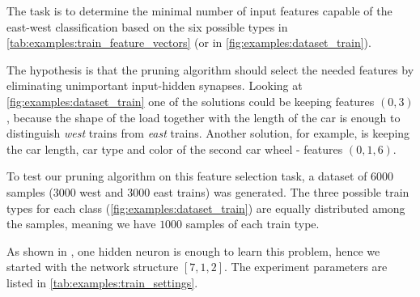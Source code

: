 The task is to determine the minimal number of input features capable of the east-west classification based on the six possible types in \cref{tab:examples:train_feature_vectors} (or in \cref{fig:examples:dataset_train}).

The hypothesis is that the pruning algorithm should select the needed features by eliminating unimportant input-hidden synapses. Looking at \cref{fig:examples:dataset_train} one of the solutions could be keeping features $ (0, 3) $, because the shape of the load together with the length of the car is enough to distinguish \textit{west} trains from \textit{east} trains. Another solution, for example, is keeping the car length, car type and color of the second car wheel - features $ (0, 1, 6) $.

To test our pruning algorithm on this feature selection task, a dataset of $ 6000 $ samples ($ 3000 $ west and $ 3000 $ east trains) was generated. The three possible train types for each class (\cref{fig:examples:dataset_train}) are equally distributed among the samples, meaning we have $ 1000 $ samples of each train type.

As shown in \citep{mozer_smolensky}, one hidden neuron is enough to learn this problem, hence we started with the network structure $ [7, 1, 2] $. The experiment parameters are listed in \cref{tab:examples:train_settings}.

\begin{table}[H]
\centering
{}
\caption{Experiment settings for the train example.}
\label{tab:examples:train_settings}
\end{table}

